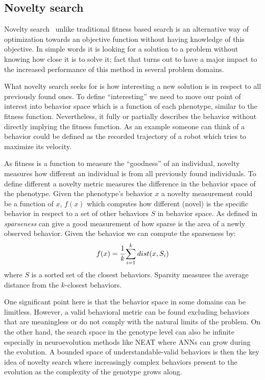 \documentclass{sig-alternate}
\begin{document}
\subsection{Novelty search}

Novelty search~\cite{lehman2008exploiting,lehman2011abandoning,lehman2010revising, risi2009novelty} unlike traditional fitness based search is an alternative way of optimization towards an objective function without having knowledge of this objective. In simple words it is looking for a solution to a problem without knowing how close it is to solve it; fact that turns out to have a major impact to the increased performance of this method in several problem domains. 

What novelty search seeks for is how interesting a new solution is in respect to all previously found ones. To define ``interesting'' we need to move our point of interest into behavior space which is a function of each phenotype, similar to the fitness function. Nevertheless, it fully or partially describes the behavior without directly implying the fitness function. As an example someone can think of a behavior could be defined as the recorded trajectory of a robot which tries to maximize its velocity. 

As fitness is a function to measure the ``goodness'' of an individual, novelty measures how different an individual is from all previously found individuals. To define different a novelty metric measures the difference in the behavior space of the phenotype. Given the phenotype's behavior $x$ a novelty measurement could be a function of $x$, $f(x)$ which computes how different (novel) is the specific behavior in respect to a set of other behaviors $S$ in behavior space.  As defined in~\cite{lehman2008exploiting,lehman2011abandoning} \emph{sparseness} can give a good measurement of how sparse is the area of a newly observed behavior. Given the behavior we can compute the sparseness by:
\begin{equation}
\label{sparsenessEquation}
f(x) = \cfrac{1}{k} \sum_{i=1}^{k} dist(x, S_i)
\end{equation}
where $S$ is a sorted set of the closest behaviors. Sparsity measures the average distance from the $k$-closest behaviors.

One significant point here is that the behavior space in some domains can be limitless. However, a valid behavioral metric can be found excluding behaviors that are meaningless or do not comply with the natural limits of the problem. On the other hand, the search space in the genotype level can also be infinite especially in neuroevolution methods like NEAT where ANNs can grow during the evolution. A bounded space of understandable-valid behaviors is then the key idea of novelty search where increasingly complex behaviors present to the evolution as the complexity of the genotype grows along.
\end{document}
